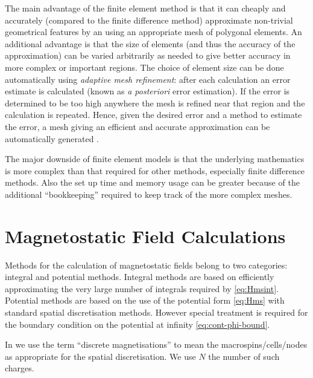 The main advantage of the finite element method is that it can cheaply and accurately (compared to the finite difference method) approximate non-trivial geometrical features by an using an appropriate mesh of polygonal elements.
An additional advantage is that the size of elements (and thus the accuracy of the approximation) can be varied arbitrarily as needed to give better accuracy in more complex or important regions. 
The choice of element size can be done automatically using \emph{adaptive mesh refinement}: after each calculation an error estimate is calculated (known as \emph{a posteriori} error estimation).
If the error is determined to be too high anywhere the mesh is refined near that region and the calculation is repeated.
Hence, given the desired error and a method to estimate the error, a mesh giving an efficient and accurate approximation can be automatically generated \cite{Schrefl1999}.

The major downside of finite element models is that the underlying mathematics is more complex than that required for other methods, especially finite difference methods.
Also the set up time and memory usage can be greater because of the additional ``bookkeeping'' required to keep track of the more complex meshes.


\section{Magnetostatic Field Calculations}
\label{sec:magn-field-calc}

Methods for the calculation of magnetostatic fields belong to two categories: integral and potential methods.
Integral methods are based on efficiently approximating the very large number of integrals required by \cref{eq:Hmsint}.
Potential methods are based on the use of the potential form \cref{eq:Hms} with standard spatial discretisation methods.
However special treatment is required for the boundary condition on the potential at infinity \cref{eq:cont-phi-bound}.

In  we use the term ``discrete magnetisations'' to mean the macrospins/cells/nodes as appropriate for the spatial discretisation.
We use $N$ the number of such charges.


